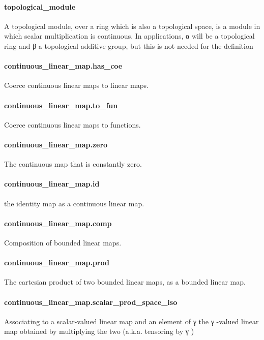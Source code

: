 \documentclass{article}
\begin{document}
\paragraph{topological\_module}
\par
A topological module, over a ring which is also a topological space, is a module in which
scalar multiplication is continuous. In applications, α will be a topological ring and β a
topological additive group, but this is not needed for the definition
\paragraph{continuous\_linear\_map.has\_coe}
\par
Coerce continuous linear maps to linear maps.
\paragraph{continuous\_linear\_map.to\_fun}
\par
Coerce continuous linear maps to functions.
\paragraph{continuous\_linear\_map.zero}
\par
The continuous map that is constantly zero.
\paragraph{continuous\_linear\_map.id}
\par
the identity map as a continuous linear map.
\paragraph{continuous\_linear\_map.comp}
\par
Composition of bounded linear maps.
\paragraph{continuous\_linear\_map.prod}
\par
The cartesian product of two bounded linear maps, as a bounded linear map.
\paragraph{continuous\_linear\_map.scalar\_prod\_space\_iso}
\par
Associating to a scalar-valued linear map and an element of 
\colorbox[RGB]{253,246,227}{{{{\color[RGB]{101, 123, 131} γ }}}} the
\colorbox[RGB]{253,246,227}{{{{\color[RGB]{101, 123, 131} γ }}}}-valued linear map obtained by multiplying the two (a.k.a. tensoring by 
\colorbox[RGB]{253,246,227}{{{{\color[RGB]{101, 123, 131} γ }}}})
\end{document}
